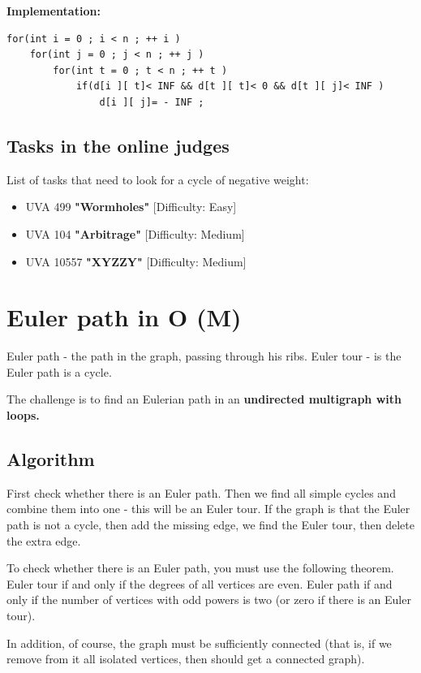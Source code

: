 \textbf{Implementation:}

\begin{verbatim}
for(int i = 0 ; i < n ; ++ i )
    for(int j = 0 ; j < n ; ++ j )
        for(int t = 0 ; t < n ; ++ t )
            if(d[i ][ t]< INF && d[t ][ t]< 0 && d[t ][ j]< INF )
                d[i ][ j]= - INF ; 
\end{verbatim}
\subsection{ Tasks in the online judges }

List of tasks that need to look for a cycle of negative weight:

\begin{itemize}

\item UVA 499 \textbf{"Wormholes"} [Difficulty: Easy]

\item UVA 104 \textbf{"Arbitrage"} [Difficulty: Medium]

\item UVA 10557 \textbf{"XYZZY"} [Difficulty: Medium]

\end{itemize}

\section{ Euler path in O (M) }
Euler path - the path in the graph, passing through his ribs. Euler tour - is the Euler path is a cycle.

The challenge is to find an Eulerian path in an \textbf{undirected multigraph with loops.}

\subsection{ Algorithm }
First check whether there is an Euler path. Then we find all simple cycles and combine them into one - this will be an Euler tour. If the graph is that the Euler path is not a cycle, then add the missing edge, we find the Euler tour, then delete the extra edge.

To check whether there is an Euler path, you must use the following theorem. Euler tour if and only if the degrees of all vertices are even. Euler path if and only if the number of vertices with odd powers is two (or zero if there is an Euler tour).

In addition, of course, the graph must be sufficiently connected (that is, if we remove from it all isolated vertices, then should get a connected graph).

